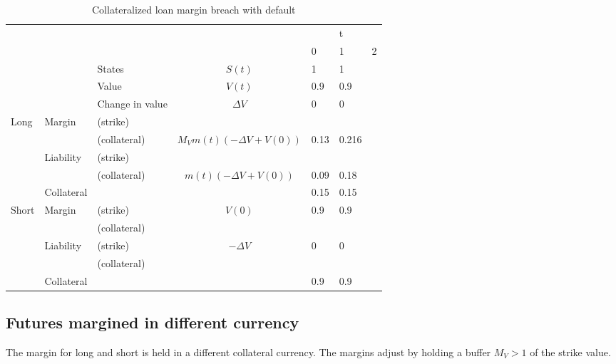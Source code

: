 \documentclass[12pt]{article}
\begin{document}
\begin{table}
\begin{tabular}{lll|c|lll}
&  &  &  &  & t &\\  
&  &  &  & 0 & 1 & 2\\
\hline
\hline
&  & States &  $S(t)$ & 1 & 1 & \\
&  & Value  &  $V(t)$  & 0.9 & 0.9 &  \\
&  & Change in value & $\Delta V$ & 0& 0 &  \\
\hline
Long      & Margin    & (strike)     &  &  &  &  \\
          &           & (collateral) & $M_V m(t)(-\Delta V + V(0))$ & 0.13 & 0.216 &\\ 
          & Liability & (strike)     &  &  &  & \\ 
          &           & (collateral)& $m(t)(-\Delta V + V(0))$& 0.09  & 0.18 &\\
          & Collateral&                       &    & 0.15 & 0.15 & \\
\hline
Short     & Margin    & (strike)     & $V(0)$ & 0.9 & 0.9 & \\
          &           & (collateral) & & & &\\
          & Liability & (strike)     & $-\Delta V$ & 0 & 0 & \\
          &           & (collateral) & & & &\\
          & Collateral&                       &    & 0.9 & 0.9 & \\ 
\hline          

\end{tabular}
\caption{Collateralized loan margin breach with default}
\label{fut}
\end{table}


\subsection{Futures margined in different currency}

The margin for long and short is held in a different collateral currency. The margins adjust by holding a buffer $M_V>1$ of the strike value.  
\end{document}
